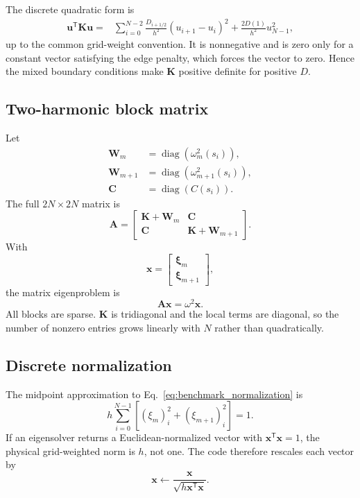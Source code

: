 The discrete quadratic form is
\begin{align}
\mathbf u^{\mathsf T}\mathbf K\mathbf u
={}&\sum_{i=0}^{N-2}\frac{D_{i+1/2}}{h^2}(u_{i+1}-u_i)^2
+\frac{2D(1)}{h^2}u_{N-1}^2,
\label{eq:discrete_K_positive}
\end{align}
up to the common grid-weight convention. It is nonnegative and is zero only for a constant vector satisfying the edge penalty, which forces the vector to zero. Hence the mixed boundary conditions make $\mathbf K$ positive definite for positive $D$.

\subsection{Two-harmonic block matrix}
Let
\begin{align}
\mathbf W_m&=\operatorname{diag}\left(\omega_m^2(s_i)\right),\\
\mathbf W_{m+1}&=\operatorname{diag}\left(\omega_{m+1}^2(s_i)\right),\\
\mathbf C&=\operatorname{diag}\left(C(s_i)\right).
\end{align}
The full $2N\times2N$ matrix is
\begin{equation}
\boxed{
\mathbf A=
\begin{bmatrix}
\mathbf K+\mathbf W_m&\mathbf C\\
\mathbf C&\mathbf K+\mathbf W_{m+1}
\end{bmatrix}.}
\label{eq:discrete_block_A}
\end{equation}
With
\begin{equation}
\mathbf x=
\begin{bmatrix}
\boldsymbol\xi_m\\
\boldsymbol\xi_{m+1}
\end{bmatrix},
\end{equation}
the matrix eigenproblem is
\begin{equation}
\boxed{\mathbf A\mathbf x=\omega^2\mathbf x.}
\label{eq:discrete_eigenproblem}
\end{equation}
All blocks are sparse. $\mathbf K$ is tridiagonal and the local terms are diagonal, so the number of nonzero entries grows linearly with $N$ rather than quadratically.

\subsection{Discrete normalization}
The midpoint approximation to Eq.~\eqref{eq:benchmark_normalization} is
\begin{equation}
h\sum_{i=0}^{N-1}\left[(\xi_m)_i^2+(\xi_{m+1})_i^2\right]=1.
\label{eq:discrete_normalization}
\end{equation}
If an eigensolver returns a Euclidean-normalized vector with $\mathbf x^{\mathsf T}\mathbf x=1$, the physical grid-weighted norm is $h$, not one. The code therefore rescales each vector by
\begin{equation}
\mathbf x\leftarrow\frac{\mathbf x}{\sqrt{h\mathbf x^{\mathsf T}\mathbf x}}.
\end{equation}


